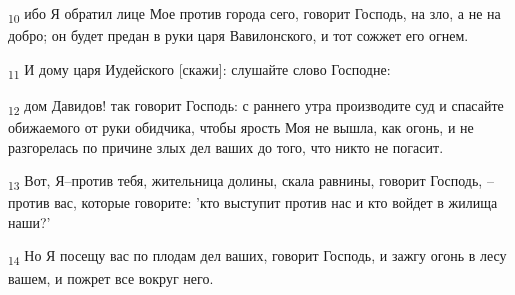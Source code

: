 \begin{tcolorbox}
\textsubscript{10} ибо Я обратил лице Мое против города сего, говорит Господь, на зло, а не на добро; он будет предан в руки царя Вавилонского, и тот сожжет его огнем.
\end{tcolorbox}
\begin{tcolorbox}
\textsubscript{11} И дому царя Иудейского [скажи]: слушайте слово Господне:
\end{tcolorbox}
\begin{tcolorbox}
\textsubscript{12} дом Давидов! так говорит Господь: с раннего утра производите суд и спасайте обижаемого от руки обидчика, чтобы ярость Моя не вышла, как огонь, и не разгорелась по причине злых дел ваших до того, что никто не погасит.
\end{tcolorbox}
\begin{tcolorbox}
\textsubscript{13} Вот, Я--против тебя, жительница долины, скала равнины, говорит Господь, --против вас, которые говорите: 'кто выступит против нас и кто войдет в жилища наши?'
\end{tcolorbox}
\begin{tcolorbox}
\textsubscript{14} Но Я посещу вас по плодам дел ваших, говорит Господь, и зажгу огонь в лесу вашем, и пожрет все вокруг него.
\end{tcolorbox}
